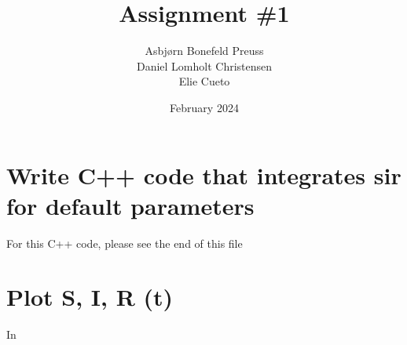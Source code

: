 \documentclass{article}
\title{Assignment \#1}
\author{Asbjørn Bonefeld Preuss\\ Daniel Lomholt Christensen \\ Elie Cueto}
\date{February 2024}
\begin{document}
\maketitle
\section*{Write C++ code that integrates sir for default parameters}
For this C++ code, please see the end of this file
\section*{Plot S, I, R (t)}
In

\newline\newline\newline\newline

\end{document}
